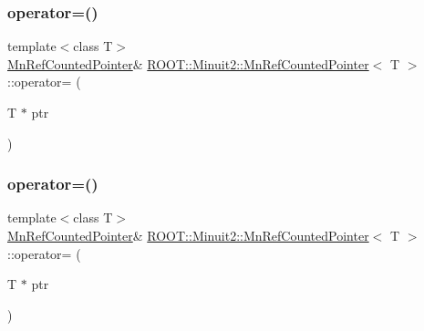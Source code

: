 \subsubsection{\texorpdfstring{operator=()}{operator=()}\hspace{0.1cm}{\footnotesize\ttfamily [4/6]}}
{\footnotesize\ttfamily template$<$class T$>$ \\
\mbox{\hyperlink{classROOT_1_1Minuit2_1_1MnRefCountedPointer}{Mn\+Ref\+Counted\+Pointer}}\& \mbox{\hyperlink{classROOT_1_1Minuit2_1_1MnRefCountedPointer}{R\+O\+O\+T\+::\+Minuit2\+::\+Mn\+Ref\+Counted\+Pointer}}$<$ T $>$\+::operator= (\begin{DoxyParamCaption}\item[{T $\ast$}]{ptr }\end{DoxyParamCaption})\hspace{0.3cm}{\ttfamily [inline]}}

\mbox{\label{classROOT_1_1Minuit2_1_1MnRefCountedPointer_a6867125c7f9d76199e7a6676eed5f682}} 
\subsubsection{\texorpdfstring{operator=()}{operator=()}\hspace{0.1cm}{\footnotesize\ttfamily [5/6]}}
{\footnotesize\ttfamily template$<$class T$>$ \\
\mbox{\hyperlink{classROOT_1_1Minuit2_1_1MnRefCountedPointer}{Mn\+Ref\+Counted\+Pointer}}\& \mbox{\hyperlink{classROOT_1_1Minuit2_1_1MnRefCountedPointer}{R\+O\+O\+T\+::\+Minuit2\+::\+Mn\+Ref\+Counted\+Pointer}}$<$ T $>$\+::operator= (\begin{DoxyParamCaption}\item[{T $\ast$}]{ptr }\end{DoxyParamCaption})\hspace{0.3cm}{\ttfamily [inline]}}

\mbox{\label{classROOT_1_1Minuit2_1_1MnRefCountedPointer_a6867125c7f9d76199e7a6676eed5f682}} 

